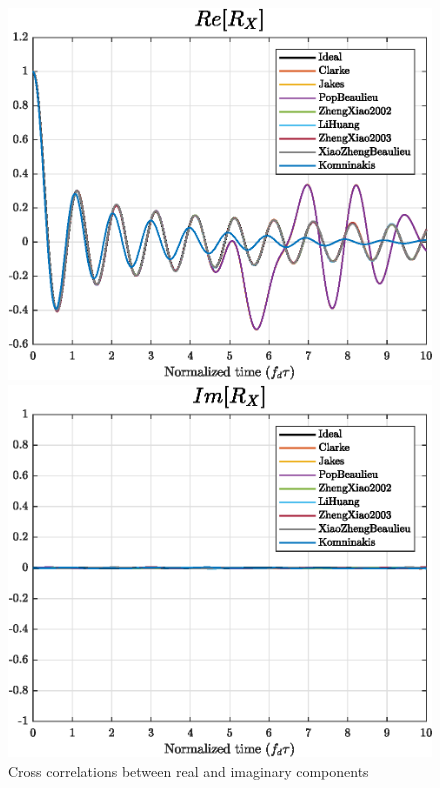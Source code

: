 \begin{figure}
	\vspace{6mm}
	
	\hfill
	\begin{minipage}{.49\linewidth}
		\includegraphics[width=\linewidth]{img/ReX.eps}
	\end{minipage}
	\hfill
	\begin{minipage}{.49\linewidth}
		\includegraphics[width=\linewidth]{img/ImX.eps}
	\end{minipage}
	\hfill
	
	\caption{Cross correlations between real and imaginary components}
	\label{fig:xcorrs}
\end{figure}


